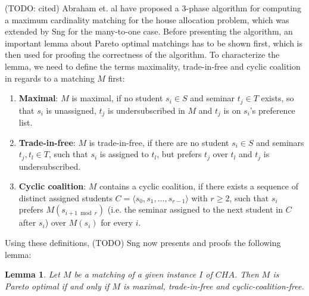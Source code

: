 (TODO: cited) Abraham et. al \cite{Abraham:Pacha} have proposed a 3-phase algorithm for computing a maximum cardinality matching for the house allocation problem, which was extended by Sng \cite{SngThesis} for the many-to-one case. Before presenting the algorithm, an important lemma about Pareto optimal matchings has to be shown first, which is then used for proofing the correctness of the algorithm. To characterize the lemma, we need to define the terms maximality, trade-in-free and cyclic coalition in regards to a matching $M$ first: 
\begin{enumerate}
    \item \textbf{Maximal}: $M$ is maximal, if no student $s_i \in S$ and seminar $t_j \in T$ exists, so that $s_i$ is unassigned, $t_j$ is undersubscribed in $M$ and $t_j$ is on $s_i$'s preference list.\cite{Abraham:Pacha}
    \item \textbf{Trade-in-free}: $M$ is trade-in-free, if there are no student $s_i \in S$ and seminars $t_j, t_l \in T$, such that $s_i$ is assigned to $t_l$, but prefers $t_j$ over $t_l$ and $t_j$ is undersubscribed.\cite{Abraham:Pacha} 
    \item \textbf{Cyclic coalition}: $M$ contains a cyclic coalition, if there exists a sequence of distinct assigned students $C = \langle s_0, s_1, \dots, s_{r-1} \rangle$ with $r \geq 2$, such that $s_i$ prefers $M(s_{i + 1 \bmod r})$ (i.e. the seminar assigned to the next student in $C$ after $s_i$) over $M(s_i)$ for every $i$.\cite{Abraham:Pacha}
\end{enumerate}
Using these definitions, (TODO) Sng now presents and proofs the following lemma:
\newtheorem{lemma}[theorem]{Lemma}
\begin{lemma}\label{lemma-pacha}
    Let $M$ be a matching of a given instance $I$ of $CHA$. Then $M$ is Pareto optimal if and only if $M$ is maximal, trade-in-free and cyclic-coalition-free.\cite{Abraham:Pacha}
\end{lemma}

